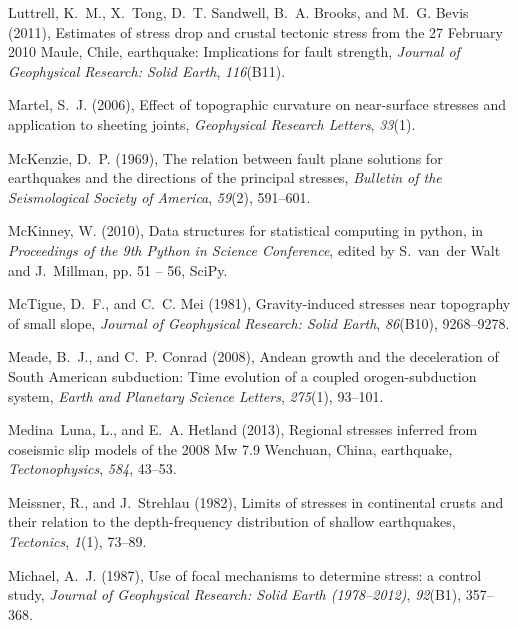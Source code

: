 \documentclass[twocolumn,jgrga]{AGUTeX}
\begin{document}
\begin{article}
{{\begin{thebibliography}{85}
Luttrell, K.~M., X.~Tong, D.~T. Sandwell, B.~A. Brooks, and M.~G. Bevis (2011),
  Estimates of stress drop and crustal tectonic stress from the 27 {F}ebruary
  2010 {M}aule, {C}hile, earthquake: Implications for fault strength,
  \textit{Journal of Geophysical Research: Solid Earth}, \textit{116}(B11).

Martel, S.~J. (2006), Effect of topographic curvature on near-surface stresses
  and application to sheeting joints, \textit{Geophysical Research Letters},
  \textit{33}(1).

McKenzie, D.~P. (1969), The relation between fault plane solutions for
  earthquakes and the directions of the principal stresses, \textit{Bulletin of
  the Seismological Society of America}, \textit{59}(2), 591--601.

McKinney, W. (2010), Data structures for statistical computing in python, in
  \textit{Proceedings of the 9th Python in Science Conference}, edited by
  S.~van~der Walt and J.~Millman, pp. 51 -- 56, SciPy.

McTigue, D.~F., and C.~C. Mei (1981), Gravity-induced stresses near topography
  of small slope, \textit{Journal of Geophysical Research: Solid Earth},
  \textit{86}(B10), 9268--9278.

Meade, B.~J., and C.~P. Conrad (2008), Andean growth and the deceleration of
  {S}outh {A}merican subduction: {T}ime evolution of a coupled
  orogen-subduction system, \textit{Earth and Planetary Science Letters},
  \textit{275}(1), 93--101.

Medina~Luna, L., and E.~A. Hetland (2013), Regional stresses inferred from
  coseismic slip models of the 2008 {M}w 7.9 {W}enchuan, {C}hina, earthquake,
  \textit{Tectonophysics}, \textit{584}, 43--53.

Meissner, R., and J.~Strehlau (1982), Limits of stresses in continental crusts
  and their relation to the depth-frequency distribution of shallow
  earthquakes, \textit{Tectonics}, \textit{1}(1), 73--89.

Michael, A.~J. (1987), Use of focal mechanisms to determine stress: a control
  study, \textit{Journal of Geophysical Research: Solid Earth (1978--2012)},
  \textit{92}(B1), 357--368.


\end{thebibliography}}}
\end{article}
\end{document}
